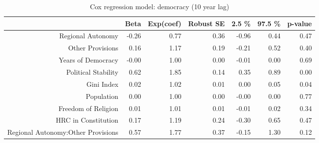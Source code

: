\begin{table}[ht]
\centering
\begin{tabular}{rrrrrrr}
  \hline
 & Beta & Exp(coef) & Robust SE & 2.5 \% & 97.5 \% & p-value \\ 
  \hline
Regional Autonomy & -0.26 & 0.77 & 0.36 & -0.96 & 0.44 & 0.47 \\ 
  Other Provisions & 0.16 & 1.17 & 0.19 & -0.21 & 0.52 & 0.40 \\ 
  Years of Democracy & -0.00 & 1.00 & 0.00 & -0.01 & 0.00 & 0.69 \\ 
  Political Stability & 0.62 & 1.85 & 0.14 & 0.35 & 0.89 & 0.00 \\ 
  Gini Index & 0.02 & 1.02 & 0.01 & 0.00 & 0.05 & 0.04 \\ 
  Population & 0.00 & 1.00 & 0.00 & -0.00 & 0.00 & 0.77 \\ 
  Freedom of Religion & 0.01 & 1.01 & 0.01 & -0.01 & 0.02 & 0.34 \\ 
  HRC in Constitution & 0.17 & 1.19 & 0.24 & -0.30 & 0.65 & 0.47 \\ 
  Regional Autonomy:Other Provisions & 0.57 & 1.77 & 0.37 & -0.15 & 1.30 & 0.12 \\ 
   \hline
\end{tabular}
\caption{Cox regression model: democracy (10 year lag)} 
\end{table}
